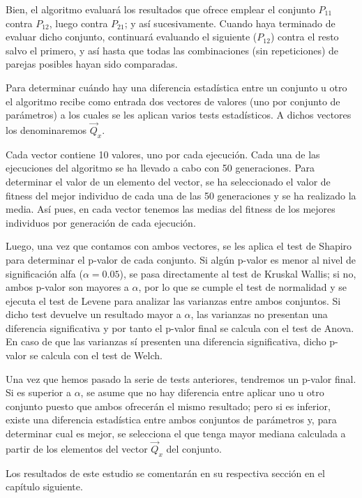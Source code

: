 Bien, el algoritmo evaluará los resultados que ofrece emplear el conjunto $P_{11}$ contra $P_{12}$, luego contra $P_{21}$; y así sucesivamente. Cuando haya terminado de evaluar dicho conjunto, continuará evaluando el siguiente ($P_{12}$) contra el resto salvo el primero, y así hasta que todas las combinaciones (sin repeticiones) de parejas posibles hayan sido comparadas.

Para determinar cuándo hay una diferencia estadística entre un conjunto u otro el algoritmo recibe como entrada dos vectores de valores (uno por conjunto de parámetros) a los cuales se les aplican varios tests estadísticos. A dichos vectores los denominaremos $\vec{Q}_x$.

Cada vector contiene 10 valores, uno por cada ejecución. Cada una de las ejecuciones del algoritmo se ha llevado a cabo con 50 generaciones. Para determinar el valor de un elemento del vector, se ha seleccionado el valor de fitness del mejor individuo de cada una de las 50 generaciones y se ha realizado la media. Así pues, en cada vector tenemos las medias del fitness de los mejores individuos por generación de cada ejecución.

Luego, una vez que contamos con ambos vectores, se les aplica el test de Shapiro para determinar el p-valor de cada conjunto. Si algún p-valor es menor al nivel de significación alfa ($\alpha = 0.05$), se pasa directamente al test de Kruskal Wallis; si no, ambos p-valor son mayores a $\alpha$, por lo que se cumple el test de normalidad y se ejecuta el test de Levene para analizar las varianzas entre ambos conjuntos. Si dicho test devuelve un resultado mayor a $\alpha$, las varianzas no presentan una diferencia significativa y por tanto el p-valor final se calcula con el test de Anova. En caso de que las varianzas sí presenten una diferencia significativa, dicho p-valor se calcula con el test de Welch.

Una vez que hemos pasado la serie de tests anteriores, tendremos un p-valor final. Si es superior a $\alpha$, se asume que no hay diferencia entre aplicar uno u otro conjunto puesto que ambos ofrecerán el mismo resultado; pero si es inferior, existe una diferencia estadística entre ambos conjuntos de parámetros y, para determinar cual es mejor, se selecciona el que tenga mayor mediana calculada a partir de los elementos del vector $\vec{Q}_x$ del conjunto.

Los resultados de este estudio se comentarán en su respectiva sección en el capítulo siguiente.